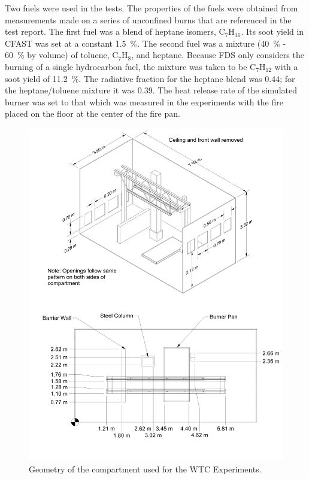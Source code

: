 Two fuels were used in the tests. The properties of the fuels were obtained from measurements made on a series of unconfined burns that are referenced in the test report.
The first fuel was a blend of heptane isomers, C$_7$H$_{16}$. Its soot yield in CFAST was set at a constant 1.5~\%. The second fuel was a mixture (40~\% - 60~\% by volume) of toluene, C$_7$H$_8$,
and heptane. Because FDS only considers the burning of a single hydrocarbon fuel, the mixture was taken to be C$_7$H$_{12}$ with a soot yield of 11.2~\%.
The radiative fraction for the heptane blend was 0.44; for the heptane/toluene mixture it was 0.39.
The heat release rate of the simulated burner was set to that which was measured in the experiments with the fire placed on the floor at the center of the fire pan.

\begin{figure}[p]
\begin{center}
\includegraphics[width=6.5in]{FIGURES/WTC/WTC_Drawing}
\end{center}
\caption[Geometry of the WTC Experiments]{Geometry of the compartment used for the WTC Experiments.}
\label{WTC_Drawing}
\end{figure}



